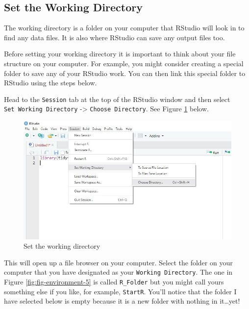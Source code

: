 \documentclass[
]{book}
\let\oldsubsection\subsection
\renewcommand{\subsection}{\needspace{3\baselineskip}\oldsubsection}  %
\begin{document}
\subsection{Set the Working Directory}\label{set-the-working-directory}

The working directory is a folder on your computer that RStudio will look in to find any data files. It is also where RStudio can save any output files too.

Before setting your working directory it is important to think about your file structure on your computer. For example, you might consider creating a special folder to save any of your RStudio work. You can then link this special folder to RStudio using the steps below.

Head to the \texttt{Session} tab at the top of the RStudio window and then select \texttt{Set\ Working\ Directory} -\textgreater{} \texttt{Choose\ Directory}. See Figure \ref{fig:fig-environment-4} below.

\begin{figure}[H]

{\centering \includegraphics[width=0.8\linewidth]{images/setwd} 

}

\caption{Set the working directory}\label{fig:fig-environment-4}
\end{figure}

This will open up a file browser on your computer. Select the folder on your computer that you have designated as your \texttt{Working\ Directory}. The one in Figure \ref{fig:fig-environment-5} is called \texttt{R\_Folder} but you might call yours something else if you like, for example, \texttt{StartR}. You'll notice that the folder I have selected below is empty because it is a new folder with nothing in it\ldots yet!
\end{document}
